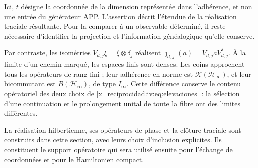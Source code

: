 Ici, \(t\) désigne la coordonnée de la dimension représentée
dans l’adhérence, et non une entrée du générateur APP. L’assertion
décrit l’étendue de la réalisation traciale résultante. Pour
la comparer à un observable déterminé, il reste nécessaire
d’identifier la projection et l’information généalogique qu’elle conserve.

Par contraste, les isométries \(V_{d,j}\xi=\xi\otimes\delta_j\) réalisent \(\jmath_{d,j}(a)=V_{d,j}aV_{d,j}^*\). À la limite d'un chemin marqué, les espaces finis sont denses. Les coins approchent tous les opérateurs de rang fini ; leur adhérence en norme est \(\mathcal K(\mathcal H_\infty)\), et leur bicommutant est \(B(\mathcal H_\infty)\), de type \(I_\infty\). Cette différence conserve le contenu opératoriel des deux choix de \eqref{x_reciprocidad:iv:eq:elevaciones} : la sélection d'une continuation et le prolongement unital de toute la fibre ont des limites différentes.

La réalisation hilbertienne, ses opérateurs de phase et la clôture
traciale sont construits dans cette section, avec leurs choix
d’inclusion explicites. Ils constituent le
support opératoire qui sera utilisé ensuite pour l’échange de
coordonnées et pour le Hamiltonien compact.
